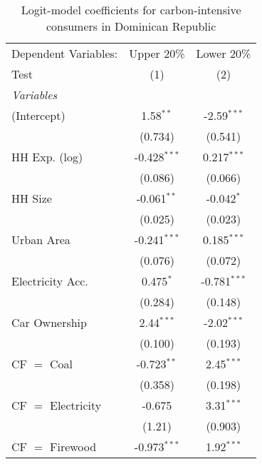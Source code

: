 
\begin{table}[htbp!]
   \centering
   \small
   \begin{adjustbox}{width = 1\textwidth, max height = 0.95\textheight, center}
      \begin{threeparttable}[b]
         \caption{\label{tab:Logit_1_DOM} Logit-model coefficients for carbon-intensive consumers in Dominican Republic}
         \begin{tabular}{lcc}
            \tabularnewline \midrule \midrule
            Dependent Variables: & Upper 20\%     & Lower 20\%\\   
            Test                 & (1)            & (2)\\  
            \midrule
            \emph{Variables}\\
            (Intercept)          & 1.58$^{**}$    & -2.59$^{***}$\\   
                                 & (0.734)        & (0.541)\\   
            HH Exp. (log)        & -0.428$^{***}$ & 0.217$^{***}$\\   
                                 & (0.086)        & (0.066)\\   
            HH Size              & -0.061$^{**}$  & -0.042$^{*}$\\   
                                 & (0.025)        & (0.023)\\   
            Urban Area           & -0.241$^{***}$ & 0.185$^{***}$\\   
                                 & (0.076)        & (0.072)\\   
            Electricity Acc.     & 0.475$^{*}$    & -0.781$^{***}$\\   
                                 & (0.284)        & (0.148)\\   
            Car Ownership        & 2.44$^{***}$   & -2.02$^{***}$\\   
                                 & (0.100)        & (0.193)\\   
            CF $=$ Coal          & -0.723$^{**}$  & 2.45$^{***}$\\   
                                 & (0.358)        & (0.198)\\   
            CF $=$ Electricity   & -0.675         & 3.31$^{***}$\\   
                                 & (1.21)         & (0.903)\\   
            CF $=$ Firewood      & -0.973$^{***}$ & 1.92$^{***}$\\   

\end{tabular}
\end{threeparttable}
\end{adjustbox}
\end{table}
